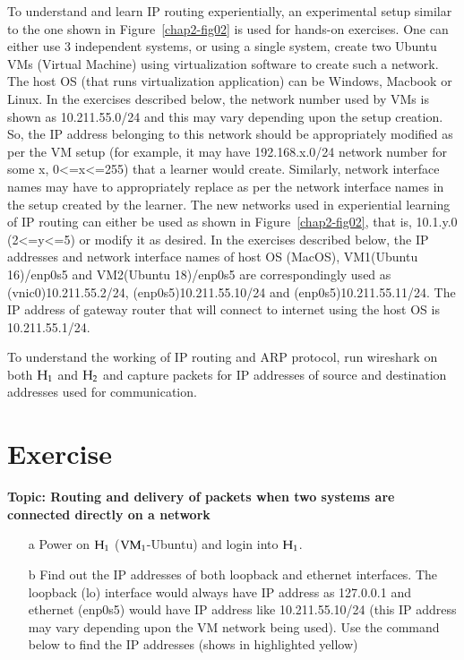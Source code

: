 \begin{multicols}{2}
To understand and learn IP routing experientially, an experimental setup similar to the one shown in Figure~\ref{chap2-fig02} is used for hands-on exercises. One can either use 3 independent systems, or using a single system, create two Ubuntu VMs (Virtual Machine) using virtualization software \cite{art2-key07}\cite{art2-key08}\cite{art2-key09} to create such a network. The host OS (that runs virtualization application) can be Windows, Macbook or Linux. In the exercises described below, the network number used by VMs is shown as 10.211.55.0/24 and this may vary depending upon the setup creation. So, the IP address belonging to this network should be appropriately modified as per the VM setup (for example, it may have 192.168.x.0/24 network number for some x, 0<=x<=255) that a learner would create. Similarly, network interface names may have to appropriately replace as per the network interface names in the setup created by the learner. The new networks used in experiential learning of IP routing can either be used as shown in Figure~\ref{chap2-fig02}, that is, 10.1.y.0 (2<=y<=5) or modify it as desired. In the exercises described below, the IP addresses and network interface names of host OS (MacOS), VM1(Ubuntu 16)/enp0s5 and VM2(Ubuntu 18)/enp0s5 are correspondingly used as (vnic0)10.211.55.2/24, (enp0s5)10.211.55.10/24 and (enp0s5)10.211.55.11/24. The IP address of gateway router that will connect to internet using the host OS is 10.211.55.1/24.

To understand the working of IP routing and ARP protocol, run wireshark on both ${\rm H}_{1}$ and ${\rm H}_{2}$ and capture packets for IP addresses of source and destination addresses used for communication.

\vspace{-.5cm}

\setcounter{section}{0}
\section*{Exercise \label{chap2-exe1}}

\textbf{Topic: Routing and delivery of packets when two systems are connected directly on a network}

\vspace{-.5cm}

\begin{itemize}
\item[a] Power on ${\rm H}_{1}$ (${\rm VM}_{1}$-Ubuntu) and login into ${\rm H}_{1}$.
\item[b] Find out the IP addresses of both loopback and ethernet interfaces. The loopback (lo) interface would always have IP address as 127.0.0.1 and ethernet (enp0s5) would have IP address like 10.211.55.10/24 (this IP address may vary depending upon the VM network being used). Use the command below to find the IP addresses (shows in highlighted yellow)


\end{itemize}
\end{multicols}
